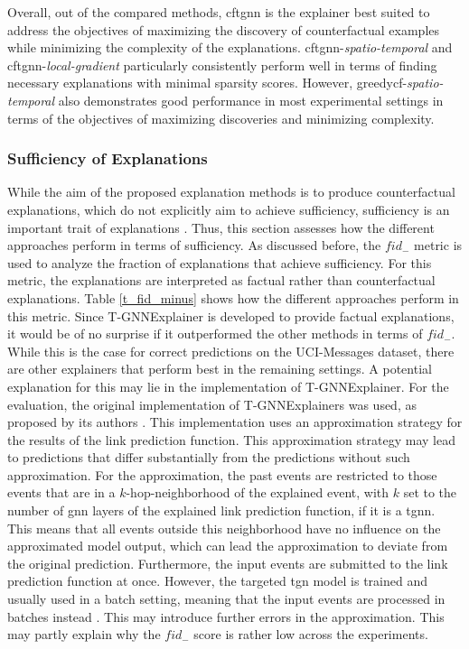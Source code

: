 Overall, out of the compared methods, \gls{cftgnn} is the explainer best suited to address the objectives of maximizing the discovery of counterfactual examples while minimizing the complexity of the explanations. \gls{cftgnn}-\textit{spatio-temporal} and \gls{cftgnn}-\textit{local-gradient} particularly consistently perform well in terms of finding necessary explanations with minimal sparsity scores. However, \gls{greedycf}-\textit{spatio-temporal} also demonstrates good performance in most experimental settings in terms of the objectives of maximizing discoveries and minimizing complexity.


\FloatBarrier

\subsubsection{Sufficiency of Explanations}
\label{s_Evaluation_Results_Sufficiency}

While the aim of the proposed explanation methods is to produce counterfactual explanations, which do not explicitly aim to achieve sufficiency, sufficiency is an important trait of explanations \cite{tan_learning_2022}. Thus, this section assesses how the different approaches perform in terms of sufficiency. As discussed before, the $fid_-$ metric is used to analyze the fraction of explanations that achieve sufficiency. For this metric, the explanations are interpreted as factual rather than counterfactual explanations. Table \ref{t_fid_minus} shows how the different approaches perform in this metric. Since T-GNNExplainer is developed to provide factual explanations, it would be of no surprise if it outperformed the other methods in terms of $fid_-$. While this is the case for correct predictions on the UCI-Messages dataset, there are other explainers that perform best in the remaining settings. A potential explanation for this may lie in the implementation of T-GNNExplainer. For the evaluation, the original implementation of T-GNNExplainers was used, as proposed by its authors \cite{xia_explaining_2023}. This implementation uses an approximation strategy for the results of the link prediction function. This approximation strategy may lead to predictions that differ substantially from the predictions without such approximation. For the approximation, the past events are restricted to those events that are in a $k$-hop-neighborhood of the explained event, with $k$ set to the number of \gls{gnn} layers of the explained link prediction function, if it is a \gls{tgnn}. This means that all events outside this neighborhood have no influence on the approximated model output, which can lead the approximation to deviate from the original prediction. Furthermore, the input events are submitted to the link prediction function at once. However, the targeted \gls{tgn} model is trained and usually used in a batch setting, meaning that the input events are processed in batches instead \cite{rossi_temporal_2020}. This may introduce further errors in the approximation. This may partly explain why the $fid_-$ score is rather low across the experiments.

